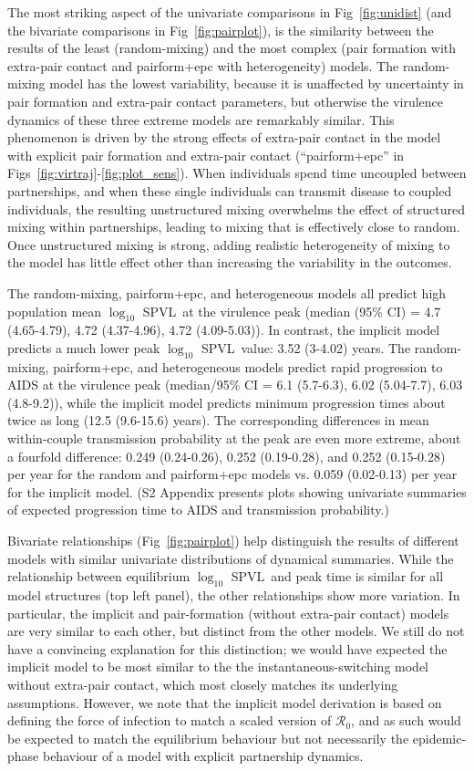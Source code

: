 \documentclass[10pt,letterpaper]{article}
\renewcommand{\figurename}{Fig}
\newcommand{\Lspvl}{$\log_{10}$ SPVL}
\newcommand{\rzero}{{\mathcal R}_0}
\begin{document}
The most striking aspect of the univariate comparisons in
\figurename~\ref{fig:unidist} (and the bivariate comparisons in
\figurename~\ref{fig:pairplot}), is the similarity between the results of the
least (random-mixing) and the most complex (pair formation with
extra-pair contact and pairform+epc with heterogeneity) models. The random-mixing model has the lowest variability, because it is unaffected by uncertainty in pair formation and extra-pair contact parameters, but otherwise the virulence
dynamics of these three extreme models are remarkably similar.
This phenomenon is driven by the strong effects of extra-pair contact in the
model with explicit pair formation and extra-pair contact 
(``pairform+epc'' in \figurename{}s~\ref{fig:virtraj}-\ref{fig:plot_sens}). When individuals spend time uncoupled between
partnerships, and when these single individuals can transmit disease
to coupled individuals, the resulting unstructured mixing overwhelms
the effect of structured mixing within partnerships, leading to mixing
that is effectively close to random.
Once unstructured mixing is strong, adding realistic heterogeneity
of mixing to the model has little effect other than increasing
the variability in the outcomes.

The random-mixing, pairform+epc,
and heterogeneous models all predict high population mean \Lspvl\ at the virulence peak
(median (95\% CI) = 4.7 (4.65-4.79), 
4.72 (4.37-4.96), 4.72  (4.09-5.03)). 
In contrast, the implicit model predicts a much lower peak \Lspvl\ value:
3.52 (3-4.02) years.
The random-mixing, pairform+epc, and heterogeneous models predict rapid
progression to AIDS at the virulence peak
(median/95\% CI = 6.1 (5.7-6.3), 6.02 (5.04-7.7), 6.03  (4.8-9.2)),
while the implicit model predicts minimum progression times about twice as long
(12.5 (9.6-15.6) years).
The corresponding differences in mean within-couple transmission
probability at the peak are even more extreme, about a fourfold difference:
0.249 (0.24-0.26), 0.252 (0.19-0.28), and 0.252 (0.15-0.28) per year for the 
random and pairform+epc models vs. 0.059 (0.02-0.13) per year
for the implicit model. (S2 Appendix presents plots showing univariate summaries
of expected progression time to AIDS and transmission probability.)

Bivariate relationships (\figurename~\ref{fig:pairplot}) help distinguish the results of 
different models with similar univariate 
distributions of dynamical summaries. While the
relationship between equilibrium \Lspvl\ and peak time is
similar for all model structures (top left panel), the other
relationships show more variation. In particular, the implicit
and pair-formation (without extra-pair contact) models are very similar
to each other, but distinct from the other models. We still do
not have a convincing explanation for this distinction; we
would have expected the implicit model to be most similar to the
the instantaneous-switching model without extra-pair contact,
which most closely matches its underlying assumptions. However, we note
that the implicit model derivation is based on defining
the force of infection to match a scaled version of $\rzero$,
and as such would be expected to match the equilibrium behaviour
but not necessarily the epidemic-phase behaviour of a model
with explicit partnership dynamics.
\end{document}
